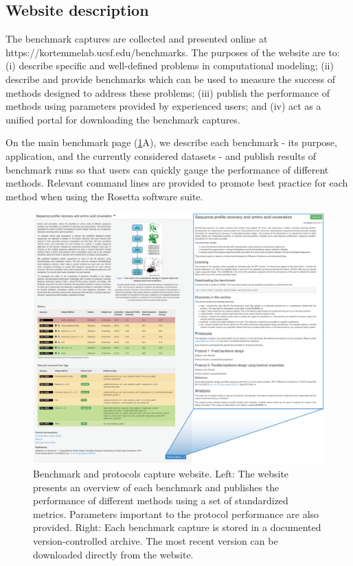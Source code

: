 \subsection{Website description}

The benchmark captures are collected and presented online at  https://kortemmelab.ucsf.edu/benchmarks. The purposes of the website are to: (i) describe specific and well-defined problems in computational modeling; (ii) describe and provide benchmarks which can be used to measure the success of methods designed to address these problems; (iii) publish the performance of methods using parameters provided by experienced users; and (iv) act as a unified portal for downloading the benchmark captures.

On the main benchmark page (\cref{fig:benchmark-website}A), we describe each benchmark - its purpose, application, and the currently considered datasets - and publish results of benchmark runs so that users can quickly gauge the performance of different methods. Relevant command lines are provided to promote best practice for each method when using the Rosetta software suite.

\begin{figure}[H]
  \centering
  \includegraphics[width=\textwidth,keepaspectratio]{figures/benchmark-fig3.png}
  \caption[Benchmark and protocols capture website]{Benchmark and protocols capture website.
Left: The website presents an overview of each benchmark and publishes the performance of different methods using a set of standardized metrics. Parameters important to the protocol performance are also provided. Right: Each benchmark capture is stored in a documented version-controlled archive. The most recent version can be downloaded directly from the website.}
  \label{fig:benchmark-website}
\end{figure}

